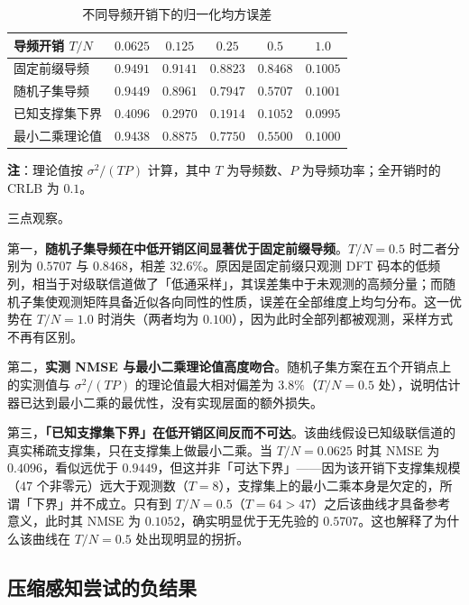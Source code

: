 \begin{table}[htbp]
  \centering
  \small
  \caption{不同导频开销下的归一化均方误差}
  \label{tab:exp_pilot}
  \begin{tabular*}{\textwidth}{@{\extracolsep{\fill}}lccccc@{}}
    \toprule
    \textbf{导频开销 $T/N$} & $0.0625$ & $0.125$ & $0.25$ & $0.5$ & $1.0$ \\
    \midrule
    固定前缀导频   & $0.9491$ & $0.9141$ & $0.8823$ & $0.8468$ & $0.1005$ \\
    随机子集导频   & $0.9449$ & $0.8961$ & $0.7947$ & $0.5707$ & $0.1001$ \\
    已知支撑集下界 & $0.4096$ & $0.2970$ & $0.1914$ & $0.1052$ & $0.0995$ \\
    最小二乘理论值 & $0.9438$ & $0.8875$ & $0.7750$ & $0.5500$ & $0.1000$ \\
    \bottomrule
  \end{tabular*}
  \vspace{0.15cm}\par
  \noindent\footnotesize{
    \textbf{注}：理论值按 $\sigma^{2}/(TP)$ 计算，其中 $T$ 为导频数、$P$ 为导频功率；全开销时的 CRLB 为 $0.1$。
  }
\end{table}

三点观察。

第一，\textbf{随机子集导频在中低开销区间显著优于固定前缀导频}。$T/N=0.5$ 时二者分别为 $0.5707$ 与 $0.8468$，相差 $32.6\%$。原因是固定前缀只观测 DFT 码本的低频列，相当于对级联信道做了「低通采样」，其误差集中于未观测的高频分量；而随机子集使观测矩阵具备近似各向同性的性质，误差在全部维度上均匀分布。这一优势在 $T/N=1.0$ 时消失（两者均为 $0.100$），因为此时全部列都被观测，采样方式不再有区别。

第二，\textbf{实测 NMSE 与最小二乘理论值高度吻合}。随机子集方案在五个开销点上的实测值与 $\sigma^{2}/(TP)$ 的理论值最大相对偏差为 $3.8\%$（$T/N=0.5$ 处），说明估计器已达到最小二乘的最优性，没有实现层面的额外损失。

第三，\textbf{「已知支撑集下界」在低开销区间反而不可达}。该曲线假设已知级联信道的真实稀疏支撑集，只在支撑集上做最小二乘。当 $T/N=0.0625$ 时其 NMSE 为 $0.4096$，看似远优于 $0.9449$，但这并非「可达下界」——因为该开销下支撑集规模（$47$ 个非零元）远大于观测数（$T=8$），支撑集上的最小二乘本身是欠定的，所谓「下界」并不成立。只有到 $T/N=0.5$（$T=64>47$）之后该曲线才具备参考意义，此时其 NMSE 为 $0.1052$，确实明显优于无先验的 $0.5707$。这也解释了为什么该曲线在 $T/N=0.5$ 处出现明显的拐折。

\subsection{压缩感知尝试的负结果}


